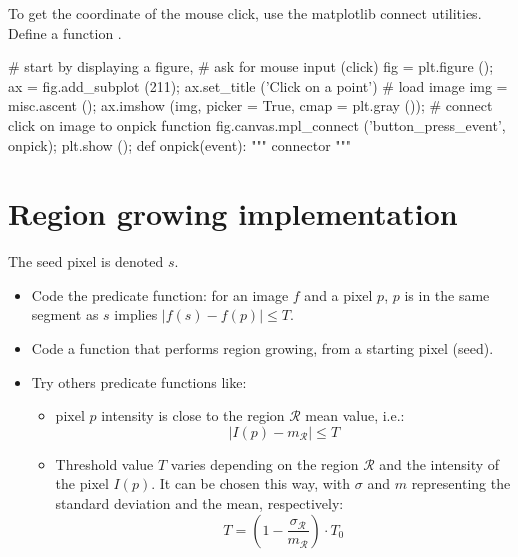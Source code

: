 \begin{pcomment}
To get the coordinate of the mouse click, use the matplotlib connect utilities. Define a function .
\begin{python}
# start by displaying a figure, 
# ask for mouse input (click)
fig = plt.figure ();
ax = fig.add_subplot (211);
ax.set_title ('Click on a point')
# load image
img = misc.ascent ();
ax.imshow (img, picker = True, cmap = plt.gray ());
# connect click on image to onpick function
fig.canvas.mpl_connect ('button_press_event', onpick);
plt.show ();
def onpick(event):
    """ connector """
\end{python}
\end{pcomment}


\section{Region growing implementation}
\begin{qbox}
The seed pixel is denoted $s$.
\begin{itemize}
 \item Code the predicate function: for an image $f$ and a pixel $p$, $p$ is in the same segment as $s$ implies $|f(s)-f(p)|\leq T$.
 \item Code a function that performs region growing, from a starting pixel (seed).
 \item Try others predicate functions like:
 \begin{itemize}
  \item pixel $p$ intensity is close to the region $\mathcal{R}$ mean value, i.e.: $$ |I(p)-m_\mathcal{R}|\leq T$$
  \item Threshold value $T$ varies depending on the region $\mathcal{R}$ and the intensity of the pixel $I(p)$. It can be chosen this way, with $\sigma$ and $m$ representing the standard deviation and the mean, respectively:
$$T=\left(1-\frac{\sigma_\mathcal{R}}{m_\mathcal{R}}\right)\cdot T_0$$
 \end{itemize}

\end{itemize}

\end{qbox}

